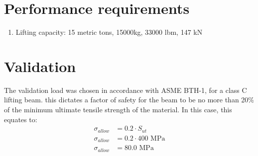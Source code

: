 \documentclass{paper}
\begin{document}
\section{Performance requirements}
\begin{enumerate}
\item Lifting capacity: 15 metric tons, 15000kg, 33000 lbm, 147 kN
\end{enumerate}
\section{Validation}
The validation load was chosen in accordance with ASME BTH-1, for a class C lifting beam. this dictates a factor of safety for the beam to be no more than 20\% of the minimum ultimate tensile strength of the material. 
In this case, this equates to:
\begin{align*}
	\sigma_{\mathit{allow}} &= 0.2 \cdot S_{ut}\\
	\sigma_{allow} &= 0.2 \cdot 400  \text{ MPa} \\
	\sigma_{allow} &= 80.0 \text{ MPa}
\end{align*}
\end{document}
